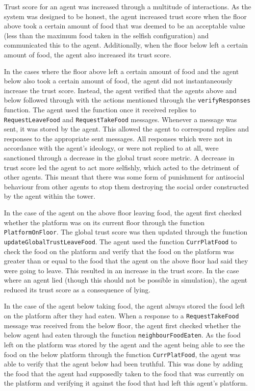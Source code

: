 Trust score for an agent was increased through a multitude of interactions. As the system was designed to be honest, the agent increased trust score when the floor above took a certain amount of food that was deemed to be an acceptable value (less than the maximum food taken in the selfish configuration) and communicated this to the agent. Additionally, when the floor below left a certain amount of food, the agent also increased its trust score.

In the cases where the floor above left a certain amount of food and the agent below also took a certain amount of food, the agent did not instantaneously increase the trust score. Instead, the agent verified that the agents above and below followed through with the actions mentioned through the \texttt{verifyResponses} function. The agent used the function once it received replies to \texttt{RequestLeaveFood} and \texttt{RequestTakeFood} messages. Whenever a message was sent, it was stored by the agent. This allowed the agent to correspond replies and responses to the appropriate sent messages. All responses which were not in accordance with the agent's ideology, or were not replied to at all, were sanctioned through a decrease in the global trust score metric. A decrease in trust score led the agent to act more selfishly, which acted to the detriment of other agents. This meant that there was some form of punishment for antisocial behaviour from other agents to stop them destroying the social order constructed by the agent within the tower.

In the case of the agent on the above floor leaving food, the agent first checked whether the platform was on its current floor through the function \texttt{PlatformOnFloor}. The global trust score was then updated through the function \texttt{updateGlobalTrustLeaveFood}. The agent used the function \texttt{CurrPlatFood} to check the food on the platform and verify that the food on the platform was greater than or equal to the food that the agent on the above floor had said they were going to leave. This resulted in an increase in the trust score. In the case where an agent lied (though this should not be possible in simulation), the agent reduced its trust score as a consequence of lying. 

In the case of the agent below taking food, the agent always stored the food left on the platform after they had eaten. When a response to a \texttt{RequestTakeFood} message was received from the below floor, the agent first checked whether the below agent had eaten through the function \texttt{neighbourFoodEaten}. As the food left on the platform was stored by the agent and the agent being able to see the food on the below platform through the function \texttt{CurrPlatFood}, the agent was able to verify that the agent below had been truthful. This was done by adding the food that the agent had supposedly taken to the food that was currently on the platform and verifying it against the food that had left this agent's platform.

